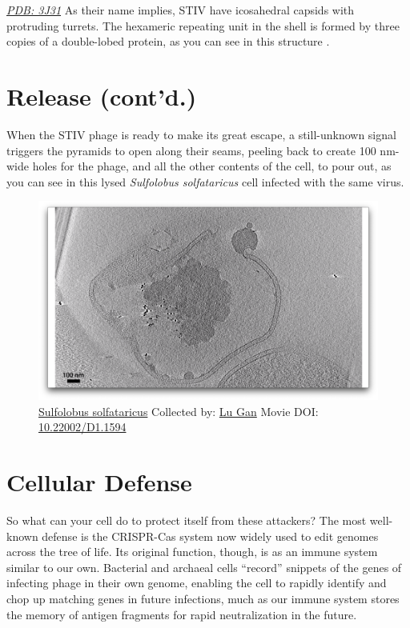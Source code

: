 \documentclass[]{tufte-book}
\begin{document}
\href{http://rcsb.org/structure/3J31}{\emph{PDB: 3J31}} As their name
implies, STIV have icosahedral capsids with protruding turrets. The
hexameric repeating unit in the shell is formed by three copies of a
double-lobed protein, as you can see in this structure
\citep{veesler2013}.

\section{Release (cont'd.)}\label{release-contd.}

When the STIV phage is ready to make its great escape, a still-unknown
signal triggers the pyramids to open along their seams, peeling back to
create 100 nm-wide holes for the phage, and all the other contents of
the cell, to pour out, as you can see in this lysed \emph{Sulfolobus
solfataricus} cell infected with the same virus.





\begin{figure}
\includegraphics{movie_stills/10_9} \caption[\protect\hyperlink{tree}{Sulfolobus solfataricus} Collected
by: \protect\hyperlink{lu_gan}{Lu Gan} Movie DOI:
\href{https://doi.org/10.22002/D1.1594}{10.22002/D1.1594}]{\protect\hyperlink{tree}{Sulfolobus solfataricus} Collected
by: \protect\hyperlink{lu_gan}{Lu Gan} Movie DOI:
\href{https://doi.org/10.22002/D1.1594}{10.22002/D1.1594}}\label{fig:10-9}
\end{figure}

\section{Cellular Defense}\label{cellular-defense}

So what can your cell do to protect itself from these attackers? The
most well-known defense is the CRISPR-Cas system now widely used to edit
genomes across the tree of life. Its original function, though, is as an
immune system similar to our own. Bacterial and archaeal cells
``record'' snippets of the genes of infecting phage in their own genome,
enabling the cell to rapidly identify and chop up matching genes in
future infections, much as our immune system stores the memory of
antigen fragments for rapid neutralization in the future.
\end{document}
